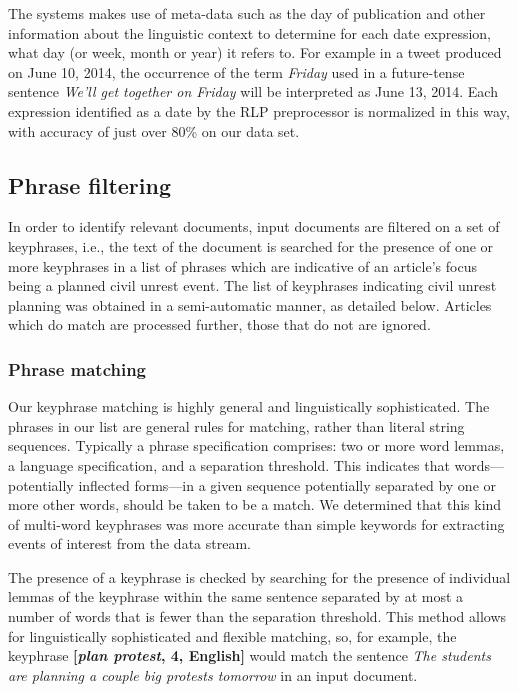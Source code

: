 The systems makes use of meta-data such as the day of publication and
other information about the linguistic context to determine for each
date expression, what day (or week, month or year) it refers to. For
example in a tweet produced on June 10, 2014, the occurrence of the
term {\em Friday} used in a future-tense sentence {\em We'll get
  together on Friday} will be interpreted as June 13, 2014.  Each
expression identified as a date by the RLP preprocessor is normalized
in this way, with accuracy of just over 80\% on our data set.

\subsection{Phrase filtering}
In order to identify relevant documents, input documents are filtered on
a set of keyphrases, i.e., the text of the document is searched for the
presence of one or more keyphrases in a list of phrases which are
indicative of an article's focus being a planned civil unrest event.
The list of keyphrases indicating civil unrest planning was obtained in
a semi-automatic manner, as detailed below.  Articles which do match are
processed further, those that do not are ignored.

\subsubsection{Phrase matching}
Our keyphrase matching is highly general and linguistically
sophisticated.  The phrases in our list are general rules for matching,
rather than literal string sequences. Typically a phrase specification
comprises: two or more word lemmas, a language specification, and a
separation threshold. This indicates that words---potentially inflected
forms---in a given sequence potentially separated by one or more other
words, should be taken to be a match. We determined that this kind of
multi-word keyphrases was more accurate than simple keywords for
extracting events of interest from the data stream.

The presence of a keyphrase is checked by searching for the presence of
individual lemmas of the keyphrase within the same sentence separated
by at most a number of words that is fewer than the separation
threshold.  This method allows for linguistically sophisticated and
flexible matching, so, for example, the keyphrase {\bf [{\em plan
protest}, 4, English]} would match the sentence {\em The students are
planning a couple big protests tomorrow} in an input document.

